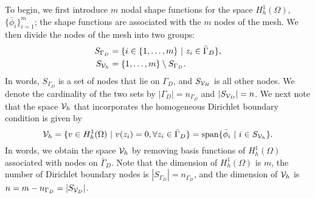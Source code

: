 To begin, we first introduce $m$ nodal shape functions for the space $H^1_h(\Omega)$, $\{ \bar \phi_i \}_{i=1}^m$; the shape functions are associated with the $m$ nodes of the mesh. We then divide the nodes of the mesh into two groups: 
\begin{align*}
  S_{\Gamma_D} &= \{ i \in \{1, \dots, m\} \ | \ z_i \in \bar \Gamma_D \}, \\
  S_{\mathcal{V}_h} &= \{ 1, \dots, m \} \setminus S_{\Gamma_D}.
\end{align*}
In words, $S_{\Gamma_D}$ is a set of nodes that lie on $\Gamma_D$, and $S_{\mathcal{V}_H}$ is all other nodes.  We denote the cardinality of the two sets by $|\Gamma_D| = n_{\Gamma_D}$ and $|S_{\mathcal{V}_D}| = n$. We next note that the space $\mathcal{V}_h$ that incorporates the homogeneous Dirichlet boundary condition is given by
\begin{equation*}
  \calV_h = \{ v \in H^1_h(\Omega) \ | \ v(z_i) = 0, \forall z_i \in \bar \Gamma_D \} = \text{span}\{ \bar \phi_i \ | \ i \in S_{\calV_h} \}.
\end{equation*}
In words, we obtain the space $\mathcal{V}_h$ by removing basis functions of $H^1_h(\Omega)$ associated with nodes on $\bar \Gamma_D$. Note that the dimension of $H^1_h(\Omega)$ is $m$, the number of Dirichlet boundary nodes is $|S_{\Gamma_D}| = n_{\Gamma_D}$, and the dimension of $\mathcal{V}_h$ is $n = m - n_{\Gamma_D} = |S_{\mathcal{V}_D}|$.

